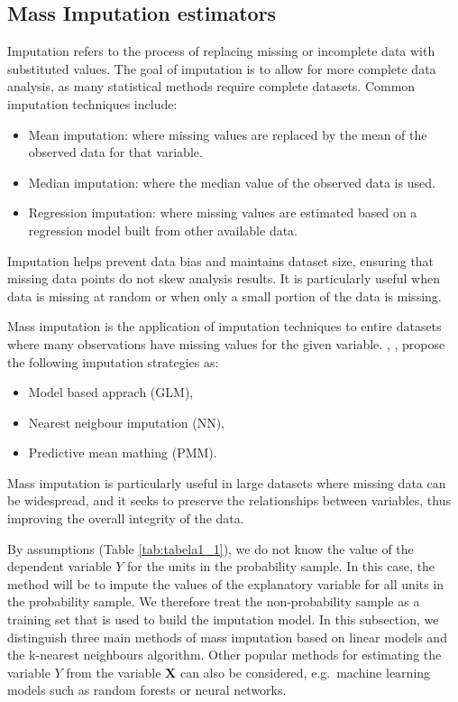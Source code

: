 \documentclass[
]{jss}
\begin{document}
\hypertarget{mass-imputation-estimators}{%
\subsection{Mass Imputation
estimators}\label{mass-imputation-estimators}}

Imputation refers to the process of replacing missing or incomplete data
with substituted values. The goal of imputation is to allow for more
complete data analysis, as many statistical methods require complete
datasets. Common imputation techniques include:

\begin{itemize}
    \item Mean imputation: where missing values are replaced by the mean of the observed data for that variable.
    \item Median imputation: where the median value of the observed data is used.
    \item Regression imputation: where missing values are estimated based on a regression model built from other available data.
\end{itemize}

Imputation helps prevent data bias and maintains dataset size, ensuring
that missing data points do not skew analysis results. It is
particularly useful when data is missing at random or when only a small
portion of the data is missing.

Mass imputation is the application of imputation techniques to entire
datasets where many observations have missing values for the given
variable. \citet{kim_combining_2021}, \citet{yang2021integration},
\citet{Beres} propose the following imputation strategies as:

\begin{itemize}
    \item Model based apprach (GLM),
    \item Nearest neigbour imputation (NN),
    \item Predictive mean mathing (PMM).
\end{itemize}

Mass imputation is particularly useful in large datasets where missing
data can be widespread, and it seeks to preserve the relationships
between variables, thus improving the overall integrity of the data.

By assumptions (Table \ref{tab:tabela1_1}), we do not know the value of
the dependent variable \(Y\) for the units in the probability sample. In
this case, the method will be to impute the values of the explanatory
variable for all units in the probability sample. We therefore treat the
non-probability sample as a training set that is used to build the
imputation model. In this subsection, we distinguish three main methods
of mass imputation based on linear models and the k-nearest neighbours
algorithm. Other popular methods for estimating the variable \(Y\) from
the variable \(\boldsymbol{X}\) can also be considered, e.g.~machine
learning models such as random forests or neural networks.
\end{document}
